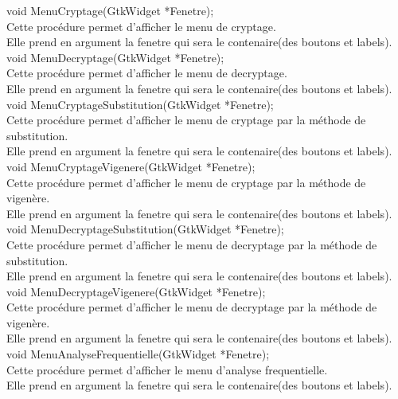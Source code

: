\documentclass[a4]{article}
\begin{document}
	void MenuCryptage(GtkWidget *Fenetre);\\
		Cette procédure permet d'afficher le menu de cryptage.\\
		Elle prend en argument la fenetre qui sera le contenaire(des boutons et labels).\\

	
	void MenuDecryptage(GtkWidget *Fenetre);\\
		Cette procédure permet d'afficher le menu de decryptage.\\
		Elle prend en argument la fenetre qui sera le contenaire(des boutons et labels).\\

	
	void MenuCryptageSubstitution(GtkWidget *Fenetre);\\
		Cette procédure permet d'afficher le menu de cryptage par la méthode de substitution.\\
		Elle prend en argument la fenetre qui sera le contenaire(des boutons et labels).\\

	
	void MenuCryptageVigenere(GtkWidget *Fenetre);\\
		Cette procédure permet d'afficher le menu de cryptage par la méthode de vigenère.\\
		Elle prend en argument la fenetre qui sera le contenaire(des boutons et labels).\\
	
	void MenuDecryptageSubstitution(GtkWidget *Fenetre);\\
		Cette procédure permet d'afficher le menu de decryptage par la méthode de substitution.\\
		Elle prend en argument la fenetre qui sera le contenaire(des boutons et labels).\\
	
	void MenuDecryptageVigenere(GtkWidget *Fenetre);\\
		Cette procédure permet d'afficher le menu de decryptage par la méthode de vigenère.\\
		Elle prend en argument la fenetre qui sera le contenaire(des boutons et labels).\\
	
	void MenuAnalyseFrequentielle(GtkWidget *Fenetre);\\
		Cette procédure permet d'afficher le menu d'analyse frequentielle.\\
		Elle prend en argument la fenetre qui sera le contenaire(des boutons et labels).\\
	
\end{document}
